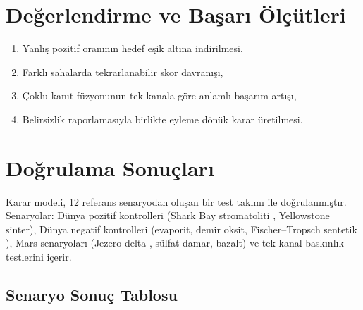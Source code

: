 \documentclass[12pt,a4paper]{article}
\begin{document}
\section{Değerlendirme ve Başarı Ölçütleri}
\begin{enumerate}[label=\arabic*.]
    \item Yanlış pozitif oranının hedef eşik altına indirilmesi,
    \item Farklı sahalarda tekrarlanabilir skor davranışı,
    \item Çoklu kanıt füzyonunun tek kanala göre anlamlı başarım artışı,
    \item Belirsizlik raporlamasıyla birlikte eyleme dönük karar üretilmesi.
\end{enumerate}

\section{Doğrulama Sonuçları}

Karar modeli, 12 referans senaryodan oluşan bir test takımı ile doğrulanmıştır. Senaryolar: Dünya pozitif kontrolleri (Shark Bay stromatoliti \cite{allwood2006}, Yellowstone sinter), Dünya negatif kontrolleri (evaporit, demir oksit, Fischer--Tropsch sentetik \cite{mccollom2006}), Mars senaryoları (Jezero delta \cite{farley2020}, sülfat damar, bazalt) ve tek kanal baskınlık testlerini içerir.

\subsection{Senaryo Sonuç Tablosu}
\end{document}
